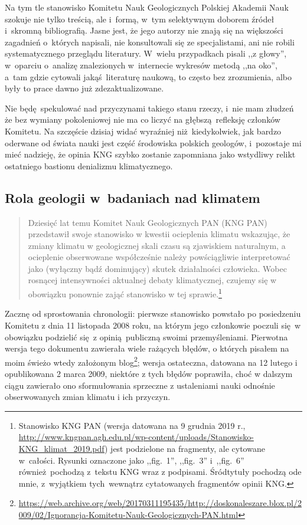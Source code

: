 \documentclass[12pt]{article}
\begin{document}
Na tym tle stanowisko Komitetu Nauk Geologicznych Polskiej Akademii Nauk szokuje nie tylko treścią, ale i~formą, w~tym selektywnym doborem źródeł i~skromną bibliografią. Jasne jest, że jego autorzy nie znają się na większości zagadnień o~których napisali, nie konsultowali się ze specjalistami, ani nie robili systematycznego przeglądu literatury. W~wielu przypadkach pisali ,,z głowy'', w~oparciu o~analizę znalezionych w~internecie wykresów metodą ,,na oko'', a~tam gdzie cytowali jakąś literaturę naukową, to często bez zrozumienia, albo były to prace dawno już zdezaktualizowane.

Nie będę spekulować nad przyczynami takiego stanu rzeczy, i~nie mam złudzeń że bez wymiany pokoleniowej nie ma co liczyć na głębszą refleksję członków Komitetu. Na szczęście dzisiaj widać wyraźniej niż kiedykolwiek, jak bardzo oderwane od świata nauki jest część środowiska polskich geologów, i~pozostaje mi mieć nadzieję, że opinia KNG szybko zostanie zapomniana jako wstydliwy relikt ostatniego bastionu denializmu klimatycznego.
\newpage

\subsection*{Rola geologii w~badaniach nad klimatem}

\begin{quotation}
	Dziesięć lat temu Komitet Nauk Geologicznych PAN (KNG PAN) przedstawił swoje stanowisko w kwestii ocieplenia klimatu wskazując, że zmiany klimatu w geologicznej skali czasu są zjawiskiem naturalnym, a ocieplenie obserwowane współcześnie należy powściągliwie interpretować jako (wyłączny bądź dominujący) skutek działalności człowieka. Wobec rosnącej intensywności aktualnej debaty klimatycznej, czujemy się w obowiązku ponownie zająć stanowisko w tej sprawie.\footnote{
	Stanowisko KNG PAN (wersja datowana na 9 grudnia 2019 r., \url{http://www.kngpan.agh.edu.pl/wp-content/uploads/Stanowisko-KNG\_klimat\_2019.pdf}) jest podzielone na fragmenty, ale cytowane w~całości. Rysunki oznaczone jako ,,fig.~1'', ,,fig.~3'' i~,,fig.~6'' również pochodzą z~tekstu KNG wraz z podpisami. Śródtytuły pochodzą ode mnie, z~wyjątkiem tych wewnątrz cytatowanych fragmentów opinii KNG.}
\end{quotation}

Zacznę od sprostowania chronologii: pierwsze stanowisko powstało po posiedzeniu Komitetu z dnia 11 listopada 2008 roku, na którym jego członkowie poczuli się w obowiązku podzielić się z opinią publiczną swoimi przemyśleniami. Pierwotna wersja tego dokumentu zawierała wiele rażących błędów, o których pisałem na moim świeżo wtedy założonym blog\footnote{\url{https://web.archive.org/web/20170311195435/http://doskonaleszare.blox.pl/2009/02/Ignorancja-Komitetu-Nauk-Geologicznych-PAN.html}}; wersja ostateczna, datowana na 12 lutego i opublikowana 2 marca 2009, niektóre z tych błędów poprawiła, choć w dalszym ciągu zawierało ono sformułowania sprzeczne z ustaleniami nauki odnośnie obserwowanych zmian klimatu i ich przyczyn.
\end{document}
